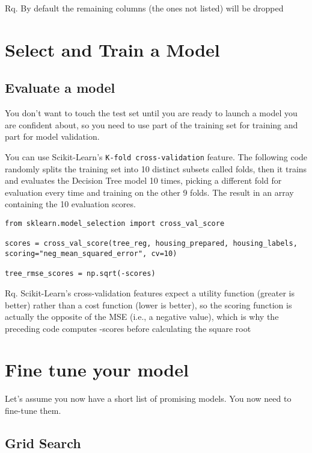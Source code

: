 \documentclass[french]{article}
\begin{document}
Rq. By default the remaining columns (the ones not listed) will be dropped

\section{Select and Train a Model}

\subsection{Evaluate a model}

You don't want to touch the test set until you are ready to launch a model you are confident about, so you need to use part of the training set for training and part for model validation.

You can use Scikit-Learn's \lstinline{K-fold cross-validation} feature. The following code randomly splits the training set into 10 distinct subsets called folds, then it trains and evaluates the Decision Tree model 10 times, picking a different fold for evaluation every time and training on the other 9 folds. The result in an array containing the 10 evaluation scores.

\begin{lstlisting}
from sklearn.model_selection import cross_val_score

scores = cross_val_score(tree_reg, housing_prepared, housing_labels, scoring="neg_mean_squared_error", cv=10)

tree_rmse_scores = np.sqrt(-scores)
\end{lstlisting}

Rq. Scikit-Learn’s cross-validation features expect a utility function (greater is better) rather than a cost function (lower is better), so the scoring function is actually the opposite of the MSE (i.e., a negative value), which is why the preceding code computes -scores before calculating the square root

\section{Fine tune your model}

Let's assume you now have a short list of promising models. You now need to fine-tune them.

\subsection{Grid Search}
\end{document}

